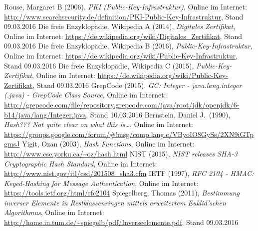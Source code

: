 \documentclass[a4paper, fontsize=12pt, parskip=full, toc=bibliographynumbered]{scrreprt}
\begin{document}
\begin{thebibliography}{9}
 Rouse, Margaret B (2006), \emph{PKI (Public-Key-Infrastruktur)}, Online im Internet: \url{http://www.searchsecurity.de/definition/PKI-Public-Key-Infrastruktur}, Stand 09.03.2016
 Die freie Enzyklopädie, Wikipedia A (2014), \emph{Digitales Zertifikat}, Online im Internet: \url{https://de.wikipedia.org/wiki/Digitales_Zertifikat}, Stand 09.03.2016
 Die freie Enzyklopädie, Wikipedia B (2016), \emph{Public-Key-Infrastruktur}, Online im Internet: \url{https://de.wikipedia.org/wiki/Public-Key-Infrastruktur}, Stand 09.03.2016
 Die freie Enzyklopädie, Wikipedia C (2015), \emph{Public-Key-Zertifikat}, Online im Internet: \url{https://de.wikipedia.org/wiki/Public-Key-Zertifikat}, Stand 09.03.2016
 GrepCode (2015), \emph{GC: Integer -
    java.lang.integer (.java) - GrepCode Class Source}, Online im
  Internet:
  \url{http://grepcode.com/file/repository.grepcode.com/java/root/jdk/openjdk/6-b14/java/lang/Integer.java},
  Stand 10.03.2016
 Bernstein, Daniel J.~(1990), \emph{Hash??? Not
    quite clear on what this is\ldots}, Online im Internet: \url{https://groups.google.com/forum/\#!msg/comp.lang.c/VByoIO8GySs/2XN9iGTpgmsJ}
 Yigit, Ozan (2003), \emph{Hash Functions}, Online
  im Internet: \url{http://www.cse.yorku.ca/~oz/hash.html}
 NIST (2015), \emph{NIST releases SHA-3
    Cryptographic Hash Standard}, Online im Internet: \url{http://www.nist.gov/itl/csd/201508_sha3.cfm}
 IETF (1997), \emph{RFC 2104 - HMAC: Keyed-Hashing
    for Message Authentication}, Online im Internet: \url{https://tools.ietf.org/html/rfc2104}
 Spiegelberg, Thomas (2011), \emph{Bestimmung inverser Elemente in Restklassenringen mittels erweitertem Euklid'schen Algorithmus}, Online im Internet: \url{http://home.in.tum.de/~spiegelb/pdf/Inverseelemente.pdf}, Stand 09.03.2016
\end{thebibliography}
\end{document}
